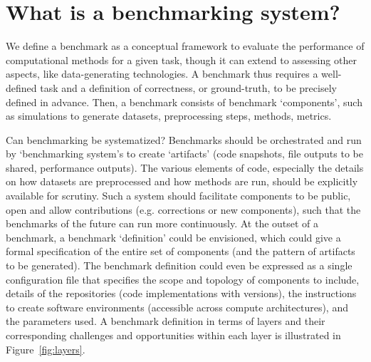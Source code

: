 \documentclass[11pt]{article}
\begin{document}
\section*{What is a benchmarking system?}

We define a benchmark as a conceptual framework to evaluate the performance of computational methods for a given task, though it can extend to assessing other aspects, like data-generating technologies.
A benchmark thus requires a well-defined task and a definition of correctness, or ground-truth, to be precisely defined in advance. Then, a benchmark consists of benchmark `components', such as simulations to generate datasets, preprocessing steps, methods, metrics. 

Can benchmarking be systematized? Benchmarks should be orchestrated and run by `benchmarking system's to create `artifacts' (code snapshots, file outputs to be shared, performance outputs).  The various elements of code, especially the details on how datasets are preprocessed and how methods are run, should be explicitly available for scrutiny. Such a system should facilitate components to be public, open and allow contributions (e.g. corrections or new components), such that the benchmarks of the future can run more continuously. At the outset of a benchmark, a benchmark `definition' could be envisioned, which could give a formal specification of the entire set of components (and the pattern of artifacts to be generated). The benchmark definition could even be expressed as a single configuration file that specifies the scope and topology of components to include, details of the repositories (code implementations with versions), the instructions to create software environments (accessible across compute architectures), and the parameters used. A benchmark definition in terms of layers and their corresponding challenges and opportunities within each layer is illustrated in Figure~\ref{fig:layers}.
\end{document}

